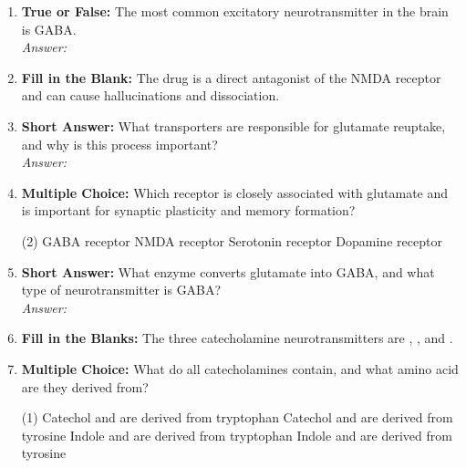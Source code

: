 \begin{enumerate}[label=\textbf{Q3.3.\arabic*}]
    \item \textbf{True or False:} The most common excitatory neurotransmitter in the brain is GABA. \\
        \textit{Answer:} %

    \item \textbf{Fill in the Blank:} The drug \underline{\hspace{3cm}} is a direct antagonist of the NMDA receptor and can cause hallucinations and dissociation.

    \item \textbf{Short Answer:} What transporters are responsible for glutamate reuptake, and why is this process important? \\
        \textit{Answer:} %

    \item \textbf{Multiple Choice:} Which receptor is closely associated with glutamate and is important for synaptic plasticity and memory formation?
        \begin{tasks}[label=\textcolor{\documentTheme}{(\Alph*)}, item-format=\color{\documentTheme}, label-width=1.5em, item-indent=1.7em](2)
            \task GABA receptor
            \task NMDA receptor
            \task Serotonin receptor
            \task Dopamine receptor
        \end{tasks}

    \item \textbf{Short Answer:} What enzyme converts glutamate into GABA, and what type of neurotransmitter is GABA? \\
        \textit{Answer:} %
    
    \item \textbf{Fill in the Blanks:} The three catecholamine neurotransmitters are \underline{\hspace{3cm}}, \underline{\hspace{3cm}}, and \underline{\hspace{3cm}}.

    \item \textbf{Multiple Choice:} What do all catecholamines contain, and what amino acid are they derived from?
        \begin{tasks}[label=\textcolor{\documentTheme}{(\Alph*)}, item-format=\color{\documentTheme}, label-width=1.5em, item-indent=1.7em](1)
            \task Catechol and are derived from tryptophan
            \task Catechol and are derived from tyrosine
            \task Indole and are derived from tryptophan
            \task Indole and are derived from tyrosine
        \end{tasks}


\end{enumerate}
